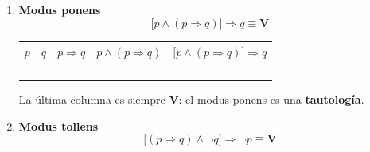 \begin{enumerate}[label=\alph*)]
\begin{center}
	\renewcommand{\arraystretch}{1.4}
	\begin{tabular}{|c|c|c|c|c|c||c|}
		\hline
		$p$ & $q$ & $\lnot q$ & $p \Rightarrow q$ & $\lnot(p \Rightarrow q)$ & $p \land (\lnot q)$ & $\lnot(p \Rightarrow q) \equiv p \land (\lnot q)$ \\
		\hline
		\V & \V & \F & \V & \F & \F & \V \\
		\hline
		\V & \F & \V & \F & \V & \V & \V \\
		\hline
		\F & \V & \F & \V & \F & \F & \V \\
		\hline
		\F & \F & \V & \V & \F & \F & \V \\
		\hline
	\end{tabular}
\end{center}
\newpage
\item \textbf{Modus ponens}
\[\bigl[p \land (p \Rightarrow q)\bigr] \Rightarrow q \equiv \mathbf{V}\]

\begin{center}
	\renewcommand{\arraystretch}{1.4}
	\begin{tabular}{|c|c|c|c||c|}
		\hline
		$p$ & $q$ & $p \Rightarrow q$ & $p \land (p \Rightarrow q)$ & $\bigl[p \land (p \Rightarrow q)\bigr] \Rightarrow q$ \\
		\hline
		\V & \V & \V & \V & \V \\
		\hline
		\V & \F & \F & \F & \V \\
		\hline
		\F & \V & \V & \F & \V \\
		\hline
		\F & \F & \V & \F & \V \\
		\hline
	\end{tabular}
\end{center}
\noindent La última columna es siempre \textbf{V}: el modus ponens es una \textbf{tautología}.

\item \textbf{Modus tollens}
\[\bigl[(p \Rightarrow q) \land \lnot q\bigr] \Rightarrow \lnot p \equiv \mathbf{V}\]


\end{enumerate}

